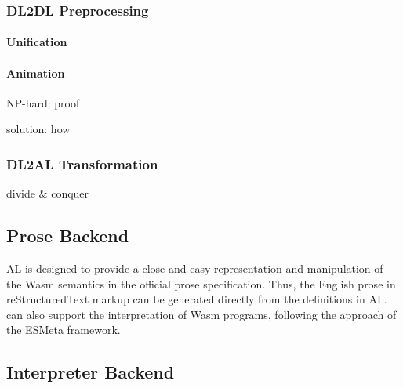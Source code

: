 \subsubsection{DL2DL Preprocessing} %
\paragraph{Unification} %
\paragraph{Animation} %
NP-hard: proof %

solution: how %
\subsubsection{DL2AL Transformation} %
divide \& conquer

\subsection{Prose Backend}\label{sec:prose} %
AL is designed to provide a close and easy representation and manipulation of
the Wasm semantics in the official prose specification.
Thus, the English prose in reStructuredText markup can be generated directly from the definitions in AL.
\spectec can also support the interpretation of Wasm programs,
following the approach of the ESMeta framework.

\subsection{Interpreter Backend}\label{sec:interp} %
%
%
%

